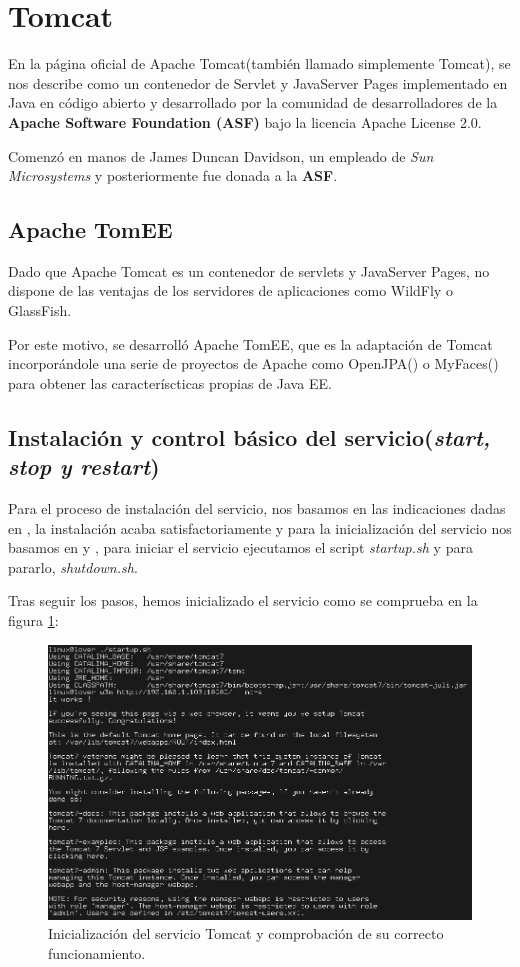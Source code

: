 \documentclass[a4paper, 10pt]{article}
\begin{document}
\section{Tomcat}
	En la página oficial de Apache Tomcat\cite{TC_official}(también llamado simplemente Tomcat),
	se nos describe como un contenedor de Servlet y JavaServer Pages implementado en Java en
	código abierto y desarrollado por la comunidad de desarrolladores de la \textbf{Apache
	Software Foundation (ASF)} bajo la licencia Apache License 2.0.
	
	Comenzó en manos de James Duncan Davidson, un empleado de \textit{Sun Microsystems} y
	posteriormente fue donada a la \textbf{ASF}.

	\subsection{Apache TomEE}
		Dado que Apache Tomcat es un contenedor de servlets y JavaServer Pages, no dispone de
		las ventajas de los servidores de aplicaciones como WildFly o GlassFish.
		
		Por este motivo, se desarrolló Apache TomEE, que es la adaptación de Tomcat
		incorporándole una serie de proyectos de Apache como OpenJPA(\cite{TC_OpenJPA}) o
		MyFaces(\cite{TC_MyFaces}) para obtener las caracteríscticas propias de Java EE.\cite{TC_TomEE}
	
	\subsection{Instalación y control básico del servicio(\textit{start, stop y restart})}
		Para el proceso de instalación del servicio, nos basamos en las indicaciones dadas en
		\cite{TC_install}, la instalación acaba satisfactoriamente y para la inicialización del
		servicio nos basamos en \cite{TC_install} y \cite{TC_config}, para iniciar el servicio
		ejecutamos el script \textit{startup.sh} y para pararlo, \textit{shutdown.sh}.
		
		Tras seguir los pasos, hemos inicializado el servicio como se comprueba en la figura
		\ref{fig:TC_Success}:
		
		\begin{figure}[h!]
			\includegraphics[width=15cm]{Success_TC.png}
			\caption{Inicialización del servicio Tomcat y comprobación de su correcto funcionamiento.}
			\label{fig:TC_Success}
		\end{figure}
\end{document}
